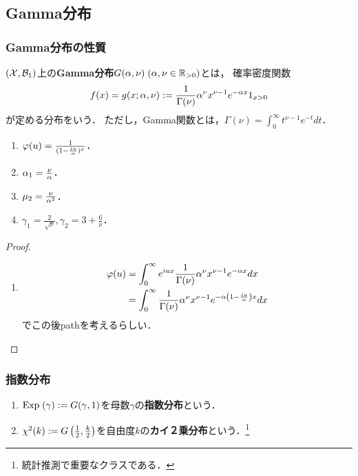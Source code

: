 \documentclass[uplatex,dvipdfmx]{jsreport}
\begin{document}
\subsection{Gamma分布}

\subsubsection{Gamma分布の性質}

\begin{definition}
    $(\mathcal{X},\mathcal{B}_1)$上の\textbf{Gamma分布}$G(\alpha,\nu)\;(\alpha,\nu\in\mathbb{R}_{>0})$とは，
    確率密度関数
    \[f(x)=g(x;\alpha,\nu):=\frac{1}{\Gamma(\nu)}\alpha^\nu x^{\nu-1}e^{-\alpha x}1_{x>0}\]
    が定める分布をいう．
    ただし，Gamma関数とは，$\Gamma(\nu)=\int^\infty_0t^{\nu-1}e^{-t}dt$．
\end{definition}

\begin{proposition}\mbox{}
    \begin{enumerate}
        \item $\varphi(u)=\frac{1}{(1-\frac{iu}{\alpha})^\nu}$．
        \item $\alpha_1=\frac{\nu}{\alpha}$．
        \item $\mu_2=\frac{\nu}{\alpha^2}$．
        \item $\gamma_1=\frac{2}{\sqrt{\nu}},\gamma_2=3+\frac{6}{\nu}$．
    \end{enumerate}
\end{proposition}
\begin{proof}\mbox{}
    \begin{enumerate}
        \item \begin{align*}
            \varphi(u)&=\int^\infty_0e^{iux}\frac{1}{\Gamma(\nu)}\alpha^\nu x^{\nu-1}e^{-\alpha x}dx\\
            &=\int^\infty_0\frac{1}{\Gamma(\nu)}\alpha^\nu x^{\nu-1}e^{-\alpha\left(1-\frac{iu}{\alpha}\right)x}dx
        \end{align*}
        でこの後pathを考えるらしい．
    \end{enumerate}
\end{proof}

\subsubsection{指数分布}

\begin{definition}\mbox{}
    \begin{enumerate}
        \item $\mathrm{Exp}\;(\gamma):=G(\gamma,1)$を母数$\gamma$の\textbf{指数分布}という．
        \item $\chi^2(k):=G\left(\frac{1}{2},\frac{k}{2}\right)$を自由度$k$の\textbf{カイ２乗分布}という．\footnote{統計推測で重要なクラスである．}
    \end{enumerate}
\end{definition}
\end{document}
